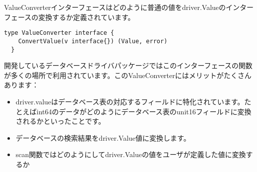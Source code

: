 ValueConverterインターフェースはどのように普通の値をdriver.Valueのインターフェースの変換するか定義されています。

\begin{lstlisting}[numbers=none]
  type ValueConverter interface {
    ConvertValue(v interface{}) (Value, error)
  }
\end{lstlisting}

開発しているデータベースドライバパッケージではこのインターフェースの関数が多くの場所で利用されています。このValueConverterにはメリットがたくさんあります：

\begin{itemize}
\item driver.valueはデータベース表の対応するフィールドに特化されています。たとえばint64のデータがどのようにデータベース表のunit16フィールドに変換されるかといったことです。
\item データベースの検索結果をdriver.Value値に変換します。
\item scan関数ではどのようにしてdriver.Valueの値をユーザが定義した値に変換するか
\end{itemize}
